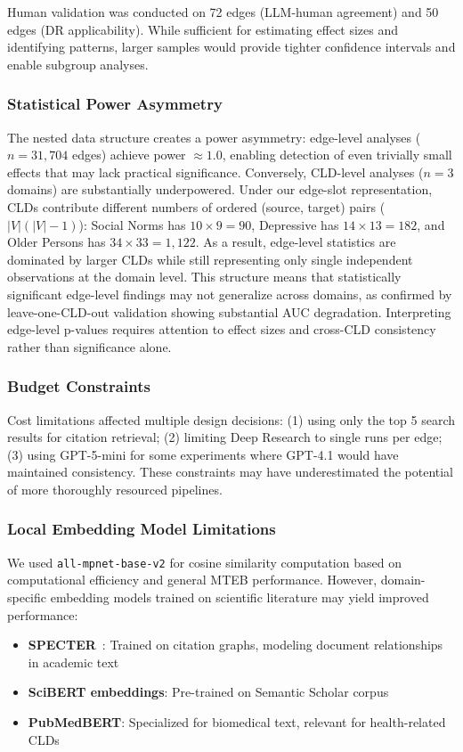 Human validation was conducted on 72 edges (LLM-human agreement) and 50 edges (DR applicability). While sufficient for estimating effect sizes and identifying patterns, larger samples would provide tighter confidence intervals and enable subgroup analyses.

\subsubsection{Statistical Power Asymmetry}

The nested data structure creates a power asymmetry: edge-level analyses ($n = 31{,}704$ edges) achieve power $\approx 1.0$, enabling detection of even trivially small effects that may lack practical significance. Conversely, CLD-level analyses ($n = 3$ domains) are substantially underpowered. Under our edge-slot representation, CLDs contribute different numbers of ordered (source, target) pairs ($|V|(|V|-1)$): Social Norms has $10\times 9=90$, Depressive has $14\times 13=182$, and Older Persons has $34\times 33=1{,}122$. As a result, edge-level statistics are dominated by larger CLDs while still representing only single independent observations at the domain level. This structure means that statistically significant edge-level findings may not generalize across domains, as confirmed by leave-one-CLD-out validation showing substantial AUC degradation. Interpreting edge-level p-values requires attention to effect sizes and cross-CLD consistency rather than significance alone.

\subsubsection{Budget Constraints}

Cost limitations affected multiple design decisions: (1) using only the top 5 search results for citation retrieval; (2) limiting Deep Research to single runs per edge; (3) using GPT-5-mini for some experiments where GPT-4.1 would have maintained consistency. These constraints may have underestimated the potential of more thoroughly resourced pipelines.

\subsubsection{Local Embedding Model Limitations}

We used \texttt{all-mpnet-base-v2} for cosine similarity computation based on computational efficiency and general MTEB performance. However, domain-specific embedding models trained on scientific literature may yield improved performance:
\begin{itemize}[noitemsep]
    \item \textbf{SPECTER}~\citep{cohan2020specter}: Trained on citation graphs, modeling document relationships in academic text
    \item \textbf{SciBERT embeddings}: Pre-trained on Semantic Scholar corpus
    \item \textbf{PubMedBERT}: Specialized for biomedical text, relevant for health-related CLDs
\end{itemize}

